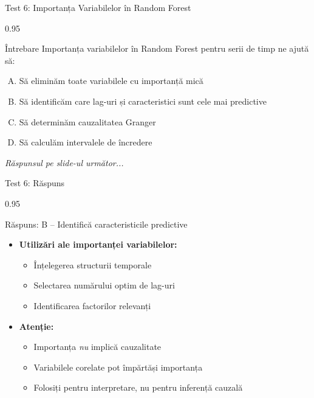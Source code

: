 \documentclass[9pt, aspectratio=169, t]{beamer}
\begin{document}
\begin{frame}{Test 6: Importanța Variabilelor în Random Forest}
    \begin{cminipage}{0.95\textwidth}
    \begin{alertblock}{Întrebare}
        Importanța variabilelor în Random Forest pentru serii de timp ne ajută să:
    \end{alertblock}

    \vspace{0.3cm}

    \begin{enumerate}[A)]\setlength{\itemsep}{0pt}
        \item Să eliminăm toate variabilele cu importanță mică
        \item Să identificăm care lag-uri și caracteristici sunt cele mai predictive
        \item Să determinăm cauzalitatea Granger
        \item Să calculăm intervalele de încredere
    \end{enumerate}

    \vspace{0.5cm}
    \begin{flushright}\textit{Răspunsul pe slide-ul următor...}\end{flushright}
    \end{cminipage}
\end{frame}

\begin{frame}{Test 6: Răspuns}
    \begin{cminipage}{0.95\textwidth}
    \begin{exampleblock}{Răspuns: B -- Identifică caracteristicile predictive}
        \begin{itemize}\setlength{\itemsep}{0pt}
            \item \textbf{Utilizări ale importanței variabilelor:}
            \begin{itemize}\setlength{\itemsep}{0pt}
                \item Înțelegerea structurii temporale
                \item Selectarea numărului optim de lag-uri
                \item Identificarea factorilor relevanți
            \end{itemize}
            \item \textbf{Atenție:}
            \begin{itemize}\setlength{\itemsep}{0pt}
                \item Importanța \emph{nu} implică cauzalitate
                \item Variabilele corelate pot împărtăși importanța
                \item Folosiți pentru interpretare, nu pentru inferență cauzală
            \end{itemize}
        \end{itemize}
    \end{exampleblock}
    \end{cminipage}
\end{frame}
\end{document}
